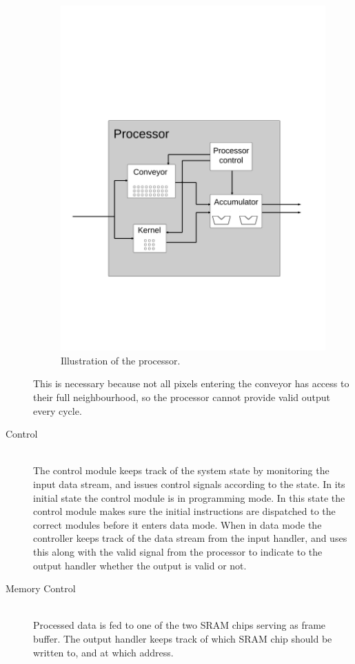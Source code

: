 \begin{description}
\begin{figure}[h!]
    \includegraphics[width=\linewidth]{img/processor.png}
    \caption{Illustration of the processor.}
    \label{fig:Convolution}
\end{figure}

        This is necessary because not all pixels entering the conveyor has access to their full neighbourhood, so the processor cannot provide valid output every cycle.
    \item[Control] \hfill\\
        The control module keeps track of the system state by monitoring the input data stream, and issues control signals according to the state.
        In its initial state the control module is in programming mode. 
        In this state the control module makes sure the initial instructions are dispatched to the correct modules before it enters data mode.
        When in data mode the controller keeps track of the data stream from the input handler, and uses this along with the valid signal from the processor to indicate to the output handler whether the output is valid or not.
    \item[Memory Control] \hfill\\
        Processed data is fed to one of the two SRAM chips serving as frame buffer. The output handler keeps track of which SRAM chip should be written to, and at which address.
\end{description}

